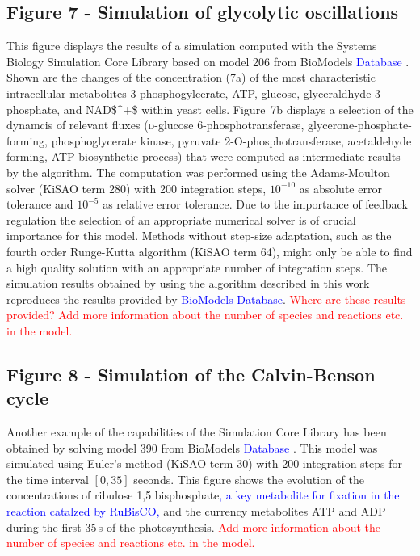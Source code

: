 \documentclass[10pt]{bmc_article}
\newenvironment{bmcformat}{\fussy\setboolean{publ}{true}}{\fussy}
\newcommand{\TODO}[1]{\textcolor{red}{#1}}
\newcommand{\COR}[1]{\textcolor{blue}{#1}}
\begin{document}
\begin{bmcformat}
\subsection*{Figure 7 - Simulation of glycolytic oscillations}
This figure displays the results of a simulation computed with the Systems
Biology Simulation Core Library based on model 206 from BioModels \COR{Database}
\cite{Novere2006a, Wolf2000}.
Shown are the changes of the concentration (7a) of the most characteristic
intracellular metabolites 3-phosphogylcerate, \acs{ATP}, glucose, glyceraldhyde 
3-phosphate, and \acs{NAD$^+$} within yeast cells.
Figure~7b displays a selection of the dynamcis of relevant fluxes 
(\textsc{d}-glucose 6-phosphotransferase, glycerone-phosphate-forming,
phosphoglycerate kinase, pyruvate 2-O-phosphotransferase, acetaldehyde forming,
\acs{ATP} biosynthetic process)
that were computed as intermediate results by the algorithm.
The computation was performed using the Adams-Moulton solver \cite{Hairer2000}
(\acs{KiSAO} term 280) with 200 integration steps, $10^{-10}$ as absolute error
tolerance and $10^{-5}$ as relative error tolerance.
Due to the importance of feedback regulation the selection of an appropriate
numerical solver is of crucial importance for this model.
Methods without step-size adaptation, such as the fourth order Runge-Kutta
algorithm (\acs{KiSAO} term 64), might only be able to find a high quality solution 
with an appropriate number of integration steps. 
The simulation results obtained by using the algorithm described in this work
reproduces the results provided by \COR{BioModels Database}.
\TODO{Where are these results provided?}
\TODO{Add more information about the number of species and reactions etc. in the model.}

\subsection*{Figure 8 - Simulation of the Calvin-Benson cycle}
Another example of the capabilities of the Simulation Core Library has been
obtained by solving model 390 from BioModels \COR{Database} 
\cite{Novere2006a, Arnold2011}.
This model was simulated using Euler's method (\acs{KiSAO} term 30) with 200
integration steps for the time interval $[0, 35]$ seconds.
This figure shows the evolution of the concentrations of ribulose 1,5
bisphosphate\COR{, a key metabolite for  fixation in the reaction catalzed by \acf{RuBisCO},} and the currency metabolites \acs{ATP} and \acs{ADP} during the first 35\,s of
the photosynthesis.
\TODO{Add more information about the number of species and reactions etc. in the model.}



\end{bmcformat}
\end{document}
